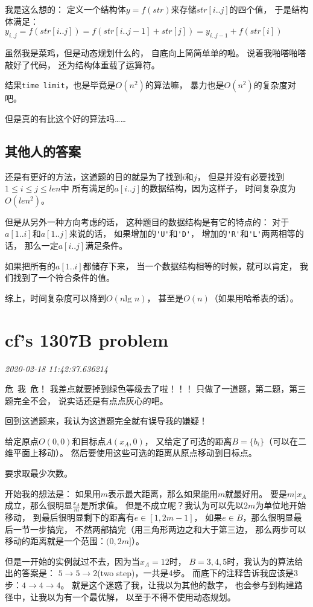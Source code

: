 \documentclass{peterlitsdoc}
\newcommand{\timetx}[1]
    {\par\noindent\emph{\pltgray\small #1}\vspace{2em}}
\newcommand{\vb}{\verb}
\begin{document}
我是这么想的：
定义一个结构体$y = f(str)$来存储$str[i..j]$的四个值，
于是结构体满足：
$y_{i..j}=f(str[i..j])=f(str[i..j-1]+str[j])=
y_{i..j-1}+f(str[i])$

虽然我是菜鸡，但是动态规划什么的，
自底向上简简单单的啦。
说着我啪嗒啪嗒敲好了代码，
还为结构体重载了运算符。

结果\vb|time limit|，也是毕竟是$O(n^2)$的算法嘛，
暴力也是$O(n^2)$的复杂度对吧。

但是真的有比这个好的算法吗\ldots\ldots

\subsection{其他人的答案}
还是有更好的方法，这道题的目的就是为了找到$i$和$j$，
但是并没有必要找到$1\le i\le j\le len$中%
所有满足的$a[i..j]$的数据结构，因为这样子，
时间复杂度为$O(len^2)$。

但是从另外一种方向考虑的话，
这种题目的数据结构是有它的特点的：
对于$a[1..i]$和$a[1..j]$来说的话，
如果增加的\vb|'U'|和\vb|'D'|，
增加的\vb|'R'|和\vb|'L'|两两相等的话，
那么一定$a[i..j]$满足条件。

如果把所有的$a[1..i]$都储存下来，
当一个数据结构相等的时候，就可以肯定，
我们找到了一个符合条件的值。

综上，时间复杂度可以降到$O(n \text{lg }n)$，
甚至是$O(n)$（如果用哈希表的话）。


\section{cf's 1307B problem}\timetx{2020-02-18 11:42:37.636214}

危\ 我\ 危！
我差点就要掉到绿色等级去了啦！！！
只做了一道题，第二题，第三题完全不会，
说实话还是有点点灰心的吧。

回到这道题来，我认为这道题完全就有误导我的嫌疑！

给定原点$O(0,0)$和目标点$A(x_A,0)$，
又给定了可选的距离$B=\{b_i\}$（可以在二维平面上移动）。
然后要使用这些可选的距离从原点移动到目标点。

要求取最少次数。

开始我的想法是：
如果用$m$表示最大距离，那么如果能用$m$就最好用。
要是$m|x_A$成立，那么很明显$\frac{x_A}{m}$是所求值。
但是不成立呢？我认为可以先以$2m$为单位地开始移动，
到最后很明显剩下的距离有$e\in [1, 2m-1]$，
如果$e\in B$，那么很明显最后一节一步搞完，
不然两部搞完（用三角形两边之和大于第三边，
那么两步可以移动的距离就是一个范围：$(0, 2m]$）。

但是一开始的实例就过不去，因为当$x_A=12$时，
$B={3, 4, 5}$时，我认为的算法给出的答案是：
$5\to 5\to 2$(two step)，一共是4步。
而底下的注释告诉我应该是3步：$4\to 4\to 4$。
就是这个迷惑了我，让我以为其他的数字，
也会参与到构建路径中，让我以为有一个最优解，
以至于不得不使用动态规划。
\end{document}
